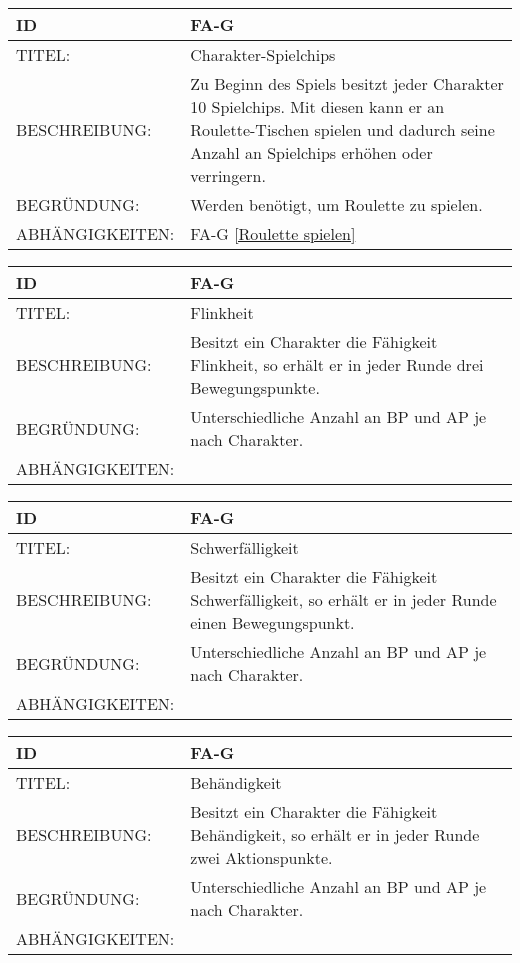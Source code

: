 \begin{tabularx}{16cm}{l|X}
	{table}\label{Charakter-Spielchips}
	\textbf{ID} & \textbf{FA-G \arabic{table}} \\
	\hline
	TITEL: & Charakter-Spielchips \\
	\hline
	BESCHREIBUNG: & Zu Beginn des Spiels besitzt jeder Charakter 10 Spielchips. Mit diesen kann er an Roulette-Tischen spielen und dadurch seine Anzahl an Spielchips erhöhen oder verringern.\\
	\hline
	BEGRÜNDUNG: & Werden benötigt, um Roulette zu spielen.\\
	\hline
	ABHÄNGIGKEITEN: & FA-G \ref{Roulette spielen}\\
\end{tabularx}

\begin{tabularx}{16cm}{l|X}
	{table}\label{Flinkheit}
	\textbf{ID} & \textbf{FA-G \arabic{table}} \\
	\hline
	TITEL: & Flinkheit \\
	\hline
	BESCHREIBUNG: & Besitzt ein Charakter die Fähigkeit Flinkheit, so erhält er in jeder Runde drei Bewegungspunkte.\\
	\hline
	BEGRÜNDUNG: & Unterschiedliche Anzahl an BP und AP je nach Charakter.\\
	\hline
	ABHÄNGIGKEITEN: & \\
\end{tabularx}

\begin{tabularx}{16cm}{l|X}
	{table}\label{Schwerfaelligkeit}
	\textbf{ID} & \textbf{FA-G \arabic{table}} \\
	\hline
	TITEL: & Schwerfälligkeit \\
	\hline
	BESCHREIBUNG: & Besitzt ein Charakter die Fähigkeit Schwerfälligkeit, so erhält er in jeder Runde einen Bewegungspunkt.\\
	\hline
	BEGRÜNDUNG: & Unterschiedliche Anzahl an BP und AP je nach Charakter.\\
	\hline
	ABHÄNGIGKEITEN: & \\
\end{tabularx}

\begin{tabularx}{16cm}{l|X}
	{table}\label{Behaendigkeit}
	\textbf{ID} & \textbf{FA-G \arabic{table}} \\
	\hline
	TITEL: & Behändigkeit \\
	\hline
	BESCHREIBUNG: & Besitzt ein Charakter die Fähigkeit Behändigkeit, so erhält er in jeder Runde zwei Aktionspunkte.\\
	\hline
	BEGRÜNDUNG: & Unterschiedliche Anzahl an BP und AP je nach Charakter.\\
	\hline
	ABHÄNGIGKEITEN: & \\
\end{tabularx}

